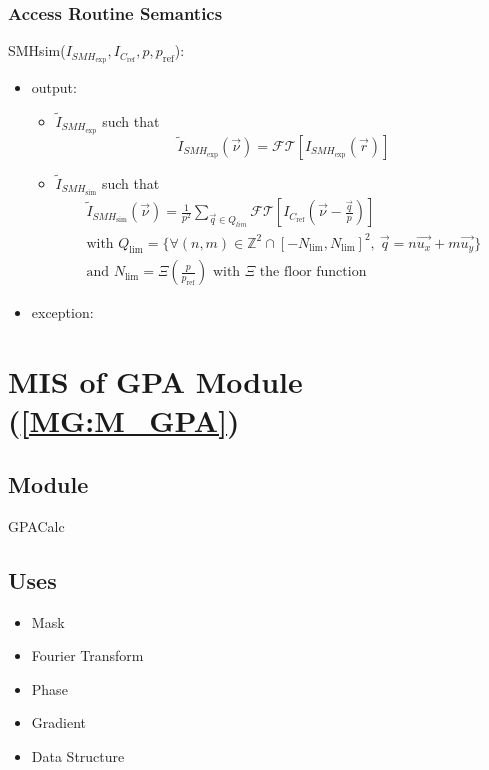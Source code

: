 \documentclass[12pt, titlepage]{article}
\begin{document}
\subsubsection{Access Routine Semantics}
\noindent SMHsim($I_{\mathit{SMH}_{\text{exp}}},I_{C_{\text{ref}}}, p, p_{\text{ref}}$):
\begin{itemize} 
\item output: 
	\begin{itemize}
	\item $\widetilde{I}_{\mathit{SMH}_{\text{exp}}}$ such that
	\begin{equation*}
	\widetilde{I}_{\mathit{SMH}_{\text{exp}}}(\vec{\nu})=\mathcal{FT}[I_{\mathit{SMH}_{\text{exp}}}(\vec{r})]
	\end{equation*}
	\item $\widetilde{I}_{\mathit{SMH}_{\text{sim}}}$ such that
	\begin{equation*}
	\begin{gathered}
	\widetilde{I}_{\mathit{SMH}_{\text{sim}}}(\vec{\nu})=\frac{1}{p^2}\sum_{\vec{q}\in Q_{lim}}\mathcal{FT}[I_{C_{\text{ref}}}(\vec{\nu}-\frac{\vec{q}}{p})] \\
	\text{with } Q_{\text{lim}}=\{\forall (n,m) \in \mathbb{Z}^{2}\cap[-N_{\text{lim}},N_{\text{lim}}]^2, \ \vec{q}=n\vec{u_x}+m\vec{u_y}\} \\
	\text{and } N_{\text{lim}}=\Xi(\frac{p}{p_{\text{ref}}}) \text{ with } \Xi \text{ the floor function } 
	\end{gathered}
	\end{equation*}
	\end{itemize}
\item exception:
\end{itemize}

\section{MIS of GPA Module (\texorpdfstring{\cref{MG:M_GPA}}))} \label{MIS_GPA}

\subsection{Module}
GPACalc
\subsection{Uses}
\begin{itemize}
\item Mask
\item Fourier Transform
\item Phase
\item Gradient
\item Data Structure
\end{itemize}
\end{document}
